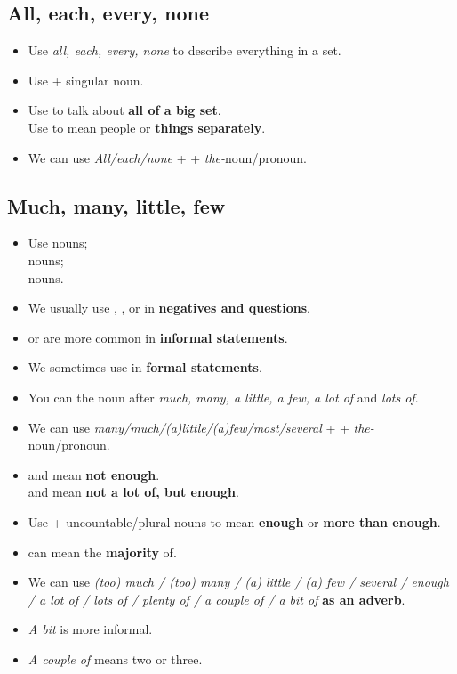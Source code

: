 \subsection{All, each, every, none}
\begin{itemize}
    \item[\doot] Use \textit{all, each, every, none} to describe everything in a set.
    \item[\doot] Use  + singular noun.
    \item[\doot] Use  to talk about \textbf{all of a big set}.\\
    Use  to mean people or \textbf{things separately}.
    \item[\doot] We can use \textit{All/each/none} +  + \textit{the-}noun/pronoun.
\end{itemize}

\subsection{Much, many, little, few}
\begin{itemize}
    \item Use  nouns;\\
     nouns;\\
     nouns.
    \item We usually use , ,  or 
    in \textbf{negatives and questions}.
    \item {} or  are more common in \textbf{informal statements}.
    \item We sometimes use  in \textbf{formal statements}.
    \item You can  the noun after \textit{much, many, a little, a few, a lot of} and \textit{lots of}.
    \item[\doot] We can use \textit{many/much/(a)little/(a)few/most/several} +  + \textit{the-}noun/pronoun.
    \item[\doot]  and  mean \textbf{not enough}.\\
     and  mean \textbf{not a lot of, but enough}.
    \item[\doot] Use  + uncountable/plural nouns to mean \textbf{enough} or \textbf{more than enough}.
    \item[\doot]  can mean the \textbf{majority} of.
    \item[\doot] We can use \textit{(too) much / (too) many / (a) little / (a) few
    / several / enough / a lot of / lots of / plenty of / a couple of / a bit of} \textbf{as an adverb}.
    \item[\aast] \textit{A bit} is more informal.
    \item[\aast] \textit{A couple of} means two or three.
\end{itemize}

